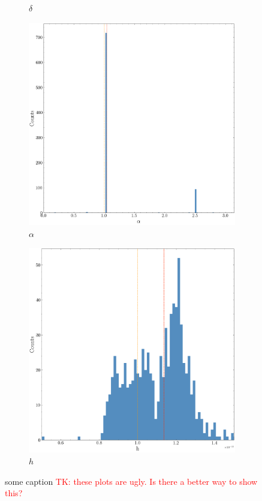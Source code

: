 \documentclass[fleqn,usenatbib,useAMS]{mnras}
\begin{document}
\begin{figure}
\begin{subfigure}[b]{0.3\textwidth}
		\caption{$\delta$}
	\end{subfigure}
	\hfill	
	\begin{subfigure}[b]{0.3\textwidth}
		\includegraphics[width=\textwidth]{images/distribution_alpha_gw}
		\caption{$\alpha$}
	\end{subfigure}
	\medskip
	

	\medskip
	\begin{subfigure}[b]{0.33\textwidth}
		\includegraphics{images/distribution_h}
		\caption{$h$}
	\end{subfigure}
	
	\caption{some caption \textcolor{red}{TK: these plots are ugly. Is there a better way to show this?}}\label{fig:median_distriubutins}
\end{figure}
\end{document}
